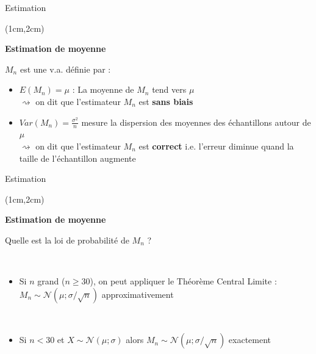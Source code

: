 \documentclass{beamer}
\begin{document}

\begin{frame}{Estimation}
\begin{textblock*}{\textwidth}(1cm,2cm)

\begin{center}{\bf \Large Estimation de moyenne} \end{center}

\vspace{0.5cm}

$M_n$ est une v.a. définie par : 
\vspace{0.2cm}
\begin{itemize}
\item $E(M_n) = \mu$ : La moyenne de $M_n$ tend vers $\mu$ \\

$\rightsquigarrow$ on dit que l'estimateur $M_n$ est {\bf sans biais} \\
\vspace{0.2cm}
\item $Var(M_n) = \displaystyle \frac{\sigma^2}{n}$ mesure la dispersion des moyennes des échantillons autour de $\mu$ \\

$\rightsquigarrow$ on dit que l'estimateur $M_n$ est {\bf correct} i.e. l'erreur diminue quand la taille de l'échantillon augmente
\end{itemize} 

\end{textblock*}

\end{frame}


\begin{frame}{Estimation}
\begin{textblock*}{\textwidth}(1cm,2cm)

\begin{center}{\bf \Large Estimation de moyenne} \end{center}
\vspace{0.5cm}
Quelle est la loi de probabilité de $M_n$ ? 

\
\begin{itemize}
\item Si $n$  grand ($n\geq 30$), on peut appliquer le
Théorème Central Limite :  $M_n\sim \mathcal{N}(\mu ; \sigma/\sqrt{n})$ approximativement

\
\item Si  $n<30$ et $X \sim \mathcal{N}(\mu ; \sigma)$ alors 
$M_n\sim \mathcal{N}(\mu ; \sigma/\sqrt{n})$ exactement

\end{itemize}

\end{textblock*}

\end{frame}
\end{document}
